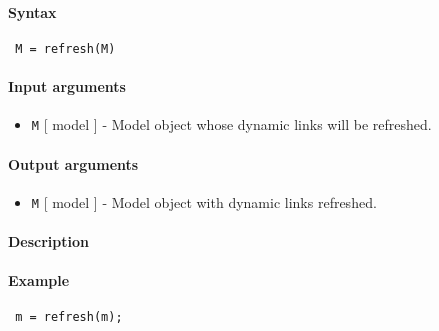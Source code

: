 


	\paragraph{Syntax}
 
 \begin{verbatim}
 M = refresh(M)
 \end{verbatim}
 
 \paragraph{Input arguments}
 
 \begin{itemize}
 \item
   \texttt{M} {[} model {]} - Model object whose dynamic links will be
   refreshed.
 \end{itemize}
 
 \paragraph{Output arguments}
 
 \begin{itemize}
 \item
   \texttt{M} {[} model {]} - Model object with dynamic links refreshed.
 \end{itemize}
 
 \paragraph{Description}
 
 \paragraph{Example}
 
 \begin{verbatim}
 m = refresh(m);
 \end{verbatim}


